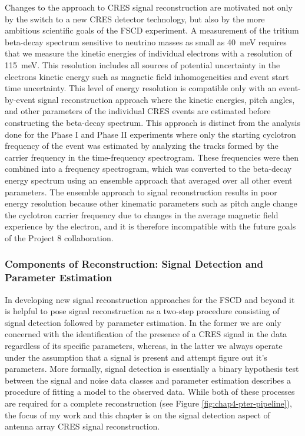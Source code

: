 Changes to the approach to CRES signal reconstruction are motivated not only by the switch to a new CRES detector technology, but also by the more ambitious scientific goals of the FSCD experiment. A measurement of the tritium beta-decay spectrum sensitive to neutrino masses as small as 40~meV requires that we measure the kinetic energies of individual electrons with a resolution of 115~meV. This resolution includes all sources of potential uncertainty in the electrons kinetic energy such as magnetic field inhomogeneities and event start time uncertainty. This level of energy resolution is compatible only with an event-by-event signal reconstruction approach where the kinetic energies, pitch angles, and other parameters of the individual CRES events are estimated before constructing the beta-decay spectrum. This approach is distinct from the analysis done for the Phase I and Phase II experiments where only the starting cyclotron frequency of the event was estimated by analyzing the tracks formed by the carrier frequency in the time-frequency spectrogram. These frequencies were then combined into a frequency spectrogram, which was converted to the beta-decay energy spectrum using an ensemble approach that averaged over all other event parameters. The ensemble approach to signal reconstruction results in poor energy resolution because other kinematic parameters such as pitch angle change the cyclotron carrier frequency due to changes in the average magnetic field experience by the electron, and it is therefore incompatible with the future goals of the Project 8 collaboration.

\subsubsection*{Components of Reconstruction: Signal Detection and Parameter Estimation}

In developing new signal reconstruction approaches for the FSCD and beyond it is helpful to pose signal reconstruction as a two-step procedure consisting of signal detection followed by parameter estimation. In the former we are only concerned with the identification of the presence of a CRES signal in the data regardless of its specific parameters, whereas, in the latter we always operate under the assumption that a signal is present and attempt figure out it's parameters. More formally, signal detection is essentially a binary hypothesis test between the signal and noise data classes and parameter estimation describes a procedure of fitting a model to the observed data. While both of these processes are required for a complete reconstruction (see Figure \ref{fig:chap4-pter-pipeline}), the focus of my work and this chapter is on the signal detection aspect of antenna array CRES signal reconstruction.

